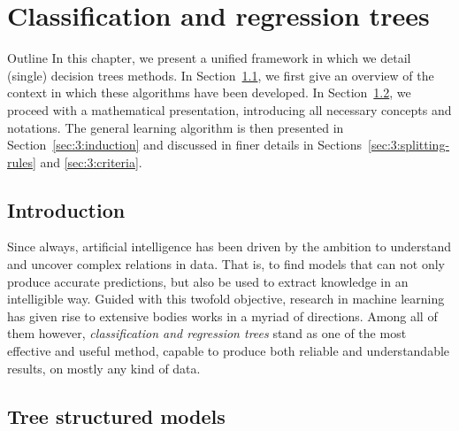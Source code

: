 \chapter{Classification and regression trees}\label{ch:cart}

\begin{remark}{Outline}
In this chapter, we present a unified framework in which we detail
(single) decision trees methods. In Section~\ref{sec:3:introduction}, we
first give an overview of the context in which these algorithms have been developed.
In Section~\ref{sec:3:tree-structured-models}, we proceed with a mathematical
presentation, introducing all necessary concepts and notations. The general learning
algorithm is then presented in Section~\ref{sec:3:induction} and discussed
in finer details in Sections~\ref{sec:3:splitting-rules} and \ref{sec:3:criteria}.
\end{remark}

\section{Introduction}
\label{sec:3:introduction}

Since always, artificial intelligence has been driven by the ambition to
understand and uncover complex relations in data. That is, to find models that
can not only produce accurate predictions, but also be used to extract
knowledge in an intelligible way. Guided with this twofold objective, research
in machine learning has given rise to extensive bodies works in a myriad of
directions. Among all of them however, \textit{classification and regression
trees} stand as one of the most effective and useful method, capable to
produce both reliable and understandable results, on mostly any kind of data.




\section{Tree structured models}
\label{sec:3:tree-structured-models}

